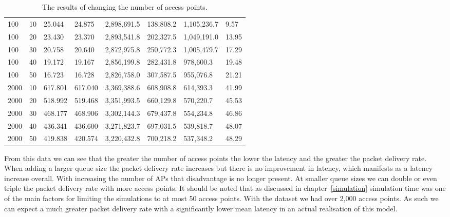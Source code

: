 \begin{landscape}
\begin{table}
\begin{tabularx}{\linewidth}{|X|X|X|X|X|X|X|X|}
                    100 & 10 & 25.044 & 24.875 & 2,898,691.5 & 138,808.2 & 1,105,236.7 & 9.57 \\
                    100 & 20 & 23.430 & 23.370 & 2,893,541.8 & 202,327.5 & 1,049,191.0 & 13.95 \\
                    100 & 30 & 20.758 & 20.640 & 2,872,975.8 & 250,772.3 & 1,005,479.7 & 17.29 \\
                    100 & 40 & 19.172 & 19.167 & 2,856,199.8 & 282,431.8 & 978,600.3 & 19.48 \\
                    100 & 50 & 16.723 & 16.728 & 2,826,758.0 & 307,587.5 & 955,076.8 & 21.21 \\
                    2000 & 10 & 617.801 & 617.040 & 3,369,388.6 & 608,908.8 & 614,393.3 & 41.99 \\
                    2000 & 20 & 518.992 & 519.468 & 3,351,993.5 & 660,129.8 & 570,220.7 & 45.53 \\
                    2000 & 30 & 468.177 & 468.906 & 3,302,144.3 & 679,437.8 & 554,234.8 & 46.86 \\
                    2000 & 40 & 436.341 & 436.600 & 3,271,823.7 & 697,031.5 & 539,818.7 & 48.07 \\
                    2000 & 50 & 419.838 & 420.574 & 3,220,432.8 & 700,218.2 & 537,348.2 & 48.29 \\
                    \hline
                \end{tabularx}
                \caption{The results of changing the number of access points.}
                \label{tab:num_aps}
            \end{table}
        \end{landscape}


        From this data we can see that the greater the number of access points the lower the latency and the greater the packet delivery rate. When adding a larger queue size the packet delivery rate increases but there is no improvement in latency, which manifests as a latency increase overall. With increasing the number of APs that disadvantage is no longer present. At smaller queue sizes we can double or even triple the packet delivery rate with more access points. It should be noted that as discussed in chapter~\ref{simulation} simulation time was one of the main factors for limiting the simulations to at most 50 access points. With the dataset we had over 2,000 access points. As such we can expect a much greater packet delivery rate with a significantly lower mean latency in an actual realisation of this model. 


